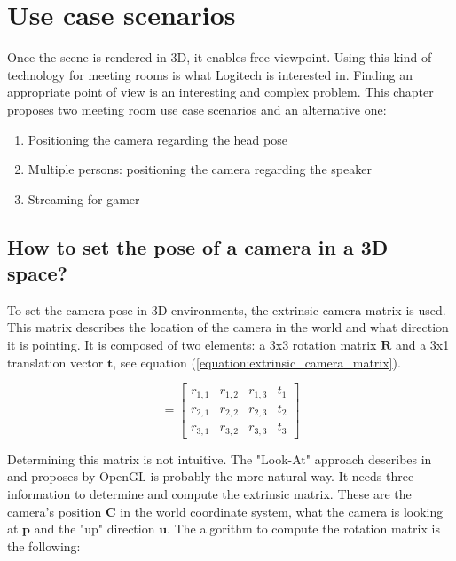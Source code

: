 \section{Use case scenarios}
\label{section:Use case scenarios}

Once the scene is rendered in 3D, it enables free viewpoint. Using this kind of technology for meeting rooms is what Logitech is interested in. Finding an appropriate point of view is an interesting and complex problem. This chapter proposes two meeting room use case scenarios and an alternative one:

\begin{enumerate}
    \item Positioning the camera regarding the head pose
    \item Multiple persons: positioning the camera regarding the speaker
    \item Streaming for gamer
\end{enumerate}

\subsection{How to set the pose of a camera in a 3D space?}

To set the camera pose in 3D environments, the extrinsic camera matrix is used. This matrix describes the location of the camera in the world and what direction it is pointing. It is composed of two elements: a 3x3 rotation matrix $\mathbf{R}$ and a 3x1 translation vector $\mathbf{t}$, see equation (\ref{equation:extrinsic_camera_matrix}).

\begin{equation}
    [R | \boldsymbol{t}]=\left[\begin{array}{lll|l}
    {r_{1,1}} & {r_{1,2}} & {r_{1,3}} & {t_{1}} \\
    {r_{2,1}} & {r_{2,2}} & {r_{2,3}} & {t_{2}} \\
    {r_{3,1}} & {r_{3,2}} & {r_{3,3}} & {t_{3}}
    \end{array}\right]
    \label{equation:extrinsic_camera_matrix}
\end{equation}

Determining this matrix is not intuitive. The "Look-At" approach describes in \cite{noauthor_dissecting_nodate} and proposes by OpenGL \cite{noauthor_glulookat_nodate} is probably the more natural way. It needs three information to determine and compute the extrinsic matrix. These are the camera's position $\mathbf{C}$ in the world coordinate system, what the camera is looking at $\mathbf{p}$ and the "up" direction $\mathbf{u}$. The algorithm to compute the rotation matrix is the following:

